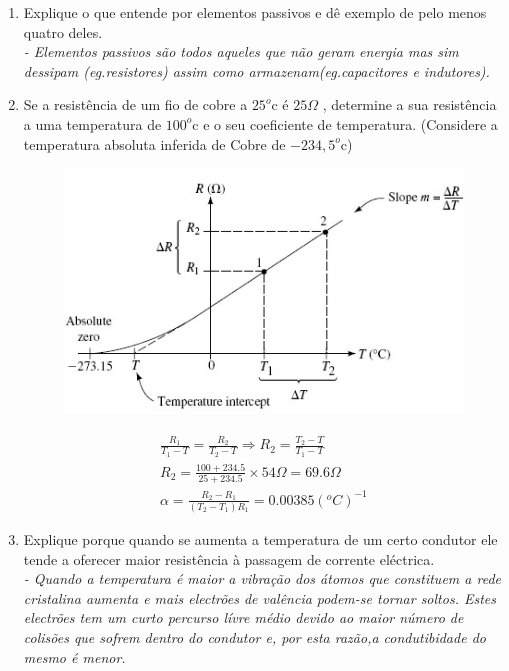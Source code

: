 \documentclass[12pt,a4paper,titlepage]{report}
\begin{document}
\begin{enumerate}
\item Explique o que entende por elementos passivos e dê exemplo de pelo menos quatro deles.\\ \color{red} \textit{- Elementos passivos s\~ao todos aqueles que n\~ao geram energia mas sim dessipam (eg.resistores) assim como armazenam(eg.capacitores e indutores).}\color{black}
\item Se a resistência de um fio de cobre a $25^o$c é $25\Omega$  , determine a sua resistência a uma temperatura de $100^o$c e o seu coeficiente de temperatura. (Considere a temperatura absoluta inferida de Cobre de $-234,5^o$c)\\ 

\begin{figure}[h]
\centering
\includegraphics[scale=0.7]{TEffect}
\end{figure}
\small
\color{red}
\begin{eqnarray}
\frac{R_1}{T_1-T}=\frac{R_2}{T_2-T}\Longrightarrow R_2=\frac{T_2-T}{T_1-T}\\ R_2=\frac{100+234.5}{25+234.5}\times 54\Omega =69.6\Omega \\
\alpha=\frac{R_2-R_1}{(T_2-T_1)R_1}=0.00385(^oC)^{-1}
\end{eqnarray}
\vspace{1cm}
\color{black}
\normalsize
\item Explique porque quando se aumenta a temperatura de um certo condutor ele tende a oferecer maior resistência à passagem de corrente eléctrica.\\
\color{red}\textit{- Quando a temperatura \'e maior a vibra\c c\~ao dos \'atomos que constituem a rede cristalina aumenta e mais electr\~oes de val\^encia podem-se tornar soltos. Estes electr\~oes tem um curto percurso l\'ivre m\'edio  devido ao maior n\'umero de colis\~oes que sofrem dentro do condutor e, por esta raz\~ao,a condutibidade do mesmo \'e menor.}\color{black}


\end{enumerate}
\end{document}
